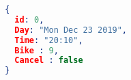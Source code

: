 \begin{lstlisting}[language=json,firstnumber=1]
{
  id: 0,
  Day: "Mon Dec 23 2019",
  Time: "20:10",
  Bike : 9,
  Cancel : false
}
\end{lstlisting}